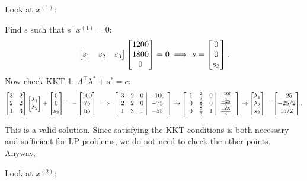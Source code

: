 
Look at $x^{(1)}$:

\medskip Find s such that $s^{\top}x^{(1)} = 0$:
\[
  \M{s_1 & s_2 & s_3}\M{1200 \\ 1800 \\ 0}= 0 \implies s = \M{0 \\ 0 \\ s_3}
  .\]
Now check KKT-1: $A^{\top}\lambda^*+ s^*=c$:
\[
  \M{3 & 2 \\ 2 & 2 \\ 1 & 3}\M{\lambda_1 \\ \lambda_2} + \M{0 \\ 0 \\ s_3} = -\M{100 \\ 75 \\ 55} \implies \MGJ{ccc|c}{3 & 2 & 0 & -100 \\ 2 & 2 & 0 & -75 \\ 1 & 3 & 1 & -55} \rightarrow \MGJ{ccc|c}{1 & \frac{2}{3} & 0 & \frac{-100}{3} \\ 0 & \frac{2}{3} & 0 & \frac{-25}{3} \\ 0 & \frac{7}{3} & 1 & \frac{-65}{3}}
  \rightarrow \M{\lambda_1 \\ \lambda_2 \\ s_3} = \M{-25 \\ -25 /2  \\ 15 /2}
.\] 

This is a valid solution. Since satisfying the KKT conditions is both necessary and sufficient for LP problems, we do not need to check the other points. Anyway, 

\medskip Look at $x^{(2)}$:

